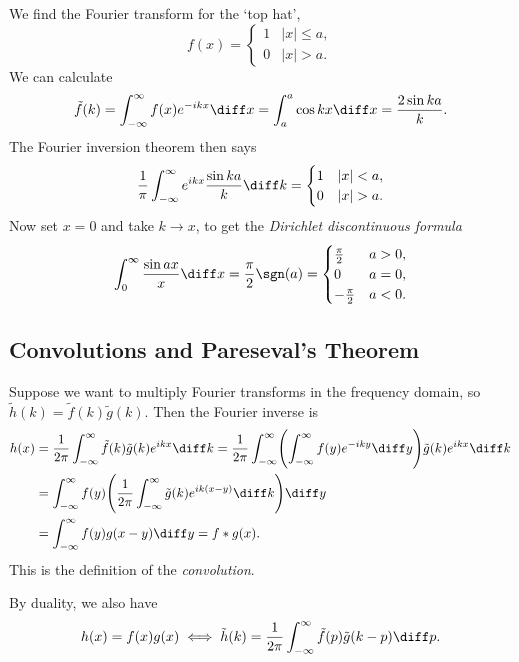 \documentclass[12pt]{article}
\begin{document}
\begin{exbox}
	We find the Fourier transform for the `top hat',
	\[
		f(x) =
		\begin{cases}
			1 & |x| \leq a, \\
			0 & |x| > a.
		\end{cases}
	\]
	We can calculate
	\[
		\tilde f(k) = \int_{-\infty}^{\infty} f(x) e^{-ikx} \diff x = \int_{a}^{a} \cos k x \diff x = \frac{2 \sin k a}{k}
	.\]
	The Fourier inversion theorem then says
	\[
	\frac{1}{\pi} \int_{-\infty}^{\infty} e^{ikx} \frac{\sin ka}{k} \diff k =
	\begin{cases}
		1 & |x| < a, \\
		0 & |x| > a.
	\end{cases}
	\]
	Now set $x = 0$ and take $k \to x$, to get the \textit{Dirichlet discontinuous formula}
	\[
	\int_{0}^{\infty} \frac{\sin a x}{x} \diff x = \frac{\pi}{2} \sgn(a) =
	\begin{cases}
		\frac{\pi}{2} & a > 0, \\
		0 & a = 0, \\
		- \frac{\pi}{2} & a < 0.
	\end{cases}
	\]
\end{exbox}

\subsection{Convolutions and Pareseval's Theorem}%
\label{sub:convolutions_and_pareseval_s_theorem}

Suppose we want to multiply Fourier transforms in the frequency domain, so $\tilde h(k) = \tilde f(k) \tilde g(k)$. Then the Fourier inverse is
\begin{align*}
	h(x) &= \frac{1}{2\pi} \int_{-\infty}^{\infty} \tilde f(k) \tilde g(k) e^{ikx} \diff k = \frac{1}{2 \pi} \int_{-\infty}^{\infty} \Biggl( \int_{-\infty}^{\infty} f(y) e^{-iky}\diff y \Biggr) \tilde g(k) e^{ikx} \diff k \\
	     &= \int_{-\infty}^{\infty} f(y) \Biggl( \frac{1}{2\pi} \int_{-\infty}^{\infty} \tilde g(k) e^{ik(x - y)}\diff k \Biggr) \diff y \\
	     &= \int_{-\infty}^{\infty} f(y) g(x - y) \diff y = f \ast g(x).
\end{align*}
This is the definition of the \textit{convolution}.

By duality, we also have
\[
	h(x) = f(x) g(x) \iff \tilde h(k) = \frac{1}{2\pi} \int_{-\infty}^{\infty} \tilde f(p) \tilde g(k - p) \diff p
.\]
\end{document}
